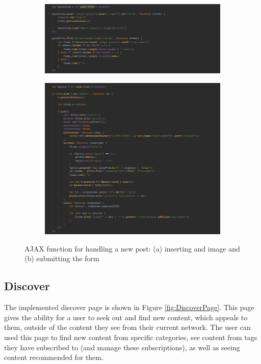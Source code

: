 \begin{figure}[H]
\ContinuedFloat
\centering
\begin{subfigure}[b]{1\linewidth}
	\includegraphics[width=\textwidth]{Images/Implementation/HomeNewPostJS}
	\caption{}
	\label{fig:HomeNewPostJS}
\end{subfigure}
\end{figure}
\begin{figure}[H]\ContinuedFloat
\begin{subfigure}[b]{1\linewidth}
	\includegraphics[width=\textwidth]{Images/Implementation/HomeNewPostJS2}
	\caption{}
	\label{fig:HomeNewPostJS2}
\end{subfigure}
\caption{AJAX function for handling a new post: (a) inserting and image and (b) submitting the form}
\label{fig:HomeNewPostAJAX}
\end{figure}

\subsection{Discover}
The implemented discover page is shown in Figure \ref{fig:DiscoverPage}. This page gives the ability for a user to seek out and find new content, which appeals to them, outside of the content they see from their current network. The user can used this page to find new content from specific categories, see content from tags they have subscribed to (and manage these subscriptions), as well as seeing content recommended for them.


